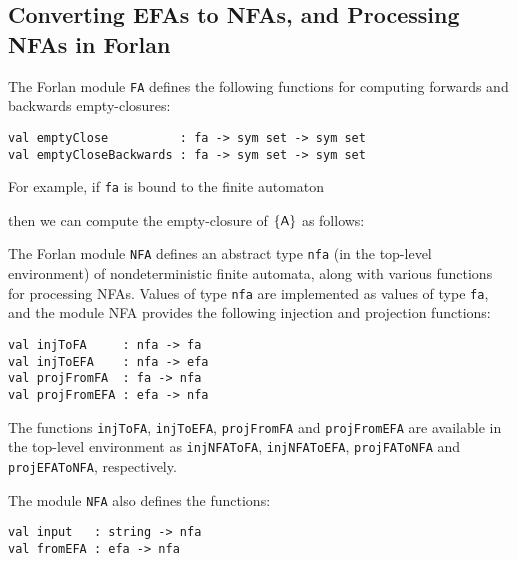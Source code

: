 \subsection{Converting EFAs to NFAs, and
Processing NFAs in Forlan}

The Forlan module \texttt{FA} defines the following functions
for computing forwards and backwards empty-closures:
\begin{verbatim}
val emptyClose          : fa -> sym set -> sym set
val emptyCloseBackwards : fa -> sym set -> sym set
\end{verbatim}
%
%

For example, if \texttt{fa} is bound to the finite automaton
\begin{center}

\end{center}
then we can compute the empty-closure of $\{\mathsf{A}\}$ as follows:


The Forlan module \texttt{NFA} defines an abstract type \texttt{nfa}
%
%
(in the top-level environment) of nondeterministic finite automata,
along with various functions for processing NFAs.  Values of type
\texttt{nfa} are implemented as values of type \texttt{fa}, and the
module NFA provides the following injection and projection functions:
\begin{verbatim}
val injToFA     : nfa -> fa
val injToEFA    : nfa -> efa
val projFromFA  : fa -> nfa
val projFromEFA : efa -> nfa
\end{verbatim}
%
%
%
%
The functions \texttt{injToFA}, \texttt{injToEFA}, \texttt{projFromFA} and
\texttt{projFromEFA} are available in the top-level environment as
\texttt{injNFAToFA}, \texttt{injNFAToEFA}, \texttt{projFAToNFA} and
\texttt{projEFAToNFA}, respectively.
%
%
%

The module \texttt{NFA} also defines the functions:
\begin{verbatim}
val input   : string -> nfa
val fromEFA : efa -> nfa
\end{verbatim}
%
%

